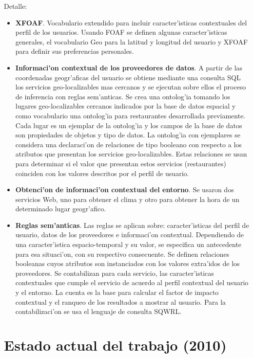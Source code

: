 \documentclass[11pt]{article}
\begin{document}
Detalle:
\begin{itemize}
\item \textbf{XFOAF}. Vocabulario extendido para incluir caracter'isticas contextuales del perfil de los usuarios. Usando FOAF se definen algunas caracter'isticas generales, el vocabulario Geo para la latitud y longitud del usuario y XFOAF para definir sus preferencias personales.
\item \textbf{Informaci'on contextual de los proveedores de datos}. A partir de las coordenadas geogr'aficas del usuario se obtiene mediante una consulta SQL los servicios geo-localizables mas cercanos y se ejecutan sobre ellos el proceso de inferencia con reglas sem'anticas. Se crea una ontolog'ia tomando los lugares geo-localizables cercanos indicados por la base de datos espacial y como vocabulario una ontolog'ia para restaurantes desarrollada previamente. Cada lugar es un ejemplar de la ontolog'ia y los campos de la base de datos son propiedades de objetos y tipo de datos. La ontolog'ia con ejemplares se considera una declaraci'on de relaciones de tipo booleano con respecto a los atributos que presentan los servicios geo-localizables. Estas relaciones se usan para determinar si el valor que presentan estos servicios (restaurantes) coinciden con los valores descritos por el perfil de usuario.
\item \textbf{Obtenci'on de informaci'on contextual del entorno}. Se usaron dos servicios Web, uno para obtener el clima y otro para obtener la hora de un determinado lugar geogr'afico.
\item \textbf{Reglas sem'anticas}. Las reglas se aplican sobre: caracter'isticas del perfil de usuario, datos de los proveedores e informaci'on contextual. Dependiendo de una caracter'istica espacio-temporal y su valor, se especifica un antecedente para esa situaci'on, con su respectivo consecuente. Se definen relaciones booleanas cuyos atributos son instanciados con los valores extra'idos de los proveedores. Se contabilizan para cada servicio, las caracter'isticas contextuales que cumple el servicio de acuerdo al perfil contextual del usuario y el entorno. La cuenta es la base para calcular el factor de impacto contextual y el ranqueo de los resultados a mostrar al usuario. Para la contabilizaci'on se usa el lenguaje de consulta SQWRL.
\end{itemize}

\section{Estado actual del trabajo (2010)}
\end{document}
